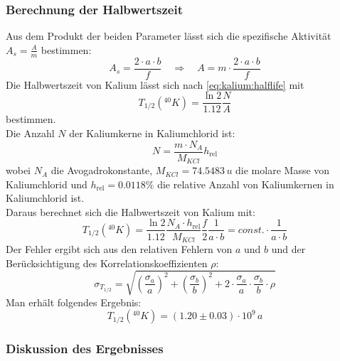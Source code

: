 \subsubsection{Berechnung der Halbwertszeit}
Aus dem Produkt der beiden Parameter lässt sich die spezifische Aktivität $A_s = \frac{A}{m}$ bestimmen:
\begin{equation}
  A_s = \frac{2 \cdot a \cdot b}{f} \quad \Rightarrow \quad A = m \cdot \frac{2 \cdot a \cdot b}{f}
\end{equation}
Die Halbwertszeit von Kalium lässt sich nach \eqref{eq:kalium:halflife} mit %
\begin{equation}
  T_{1/2}({}^{40}K) = \frac{\ln 2}{1.12} \frac{N}{A}
\end{equation}
bestimmen. \\
Die Anzahl $N$ der Kaliumkerne in Kaliumchlorid ist:
\begin{equation}
  N = \frac{m \cdot N_A}{M_{KCl}} h_{\text{rel}}
\end{equation}
wobei $N_A$ die Avogadrokonstante, $M_{KCl}=74.5483\,u$ die molare Masse von Kaliumchlorid und $h_{\text{rel}}=0.0118\%$ die relative Anzahl von Kaliumkernen 
in Kaliumchlorid ist. \\
Daraus berechnet sich die Halbwertszeit von Kalium mit:
\begin{equation}
  T_{1/2} \left( {}^{40} K \right)  = \frac{\ln 2}{1.12} \frac{N_A \cdot h_{\text{rel}}}{M_{KCl}} \frac{f}{2} \frac{1}{a \cdot b} = const. \cdot \frac{1}{a \cdot b}
\end{equation}
Der Fehler ergibt sich aus den relativen Fehlern von $a$ und $b$ und der Berücksichtigung des Korrelationskoeffizienten $\rho$:
\begin{equation}
  \sigma_{T_{1/2}} = \sqrt{ \left( \frac{\sigma_a}{a} \right)^2 + \left( \frac{\sigma_b}{b} \right)^2 + 2 \cdot \frac{\sigma_a}{a} \cdot \frac{\sigma_b}{b} \cdot \rho   }
\end{equation}
Man erhält folgendes Ergebnis:
\begin{equation}
  T_{1/2} \left( {}^{40} K \right) = (1.20 \pm 0.03) \cdot 10^9\,a  
\end{equation}

\subsubsection{Diskussion des Ergebnisses}

